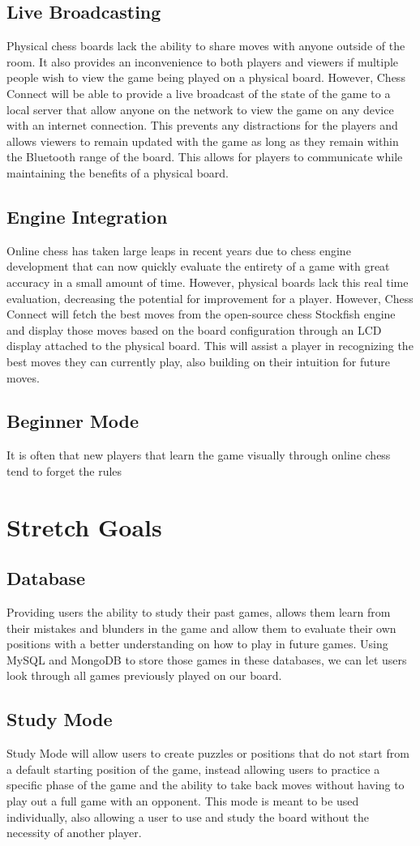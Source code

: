 \documentclass{article}
\begin{document}
\subsection{Live Broadcasting}
{Physical chess boards lack the ability to share moves with anyone outside of the room. It also provides an inconvenience to both players and viewers if multiple people wish to view the game being played on a physical board. However, Chess Connect will be able to provide a live broadcast of the state of the game to a local server that allow anyone on the network to view the game on any device with an internet connection. This prevents any distractions for the players and allows viewers to remain updated with the game as long as they remain within the Bluetooth range of the board. This allows for players to communicate while maintaining the benefits of a physical board.} 
\subsection{Engine Integration}
{Online chess has taken large leaps in recent years due to chess engine development that can now quickly evaluate the entirety of a game with great accuracy in a small amount of time. However, physical boards lack this real time evaluation, decreasing the potential for improvement for a player. However, Chess Connect will fetch the best moves from the open-source chess Stockfish engine and display those moves based on the board configuration through an LCD display attached to the physical board. This will assist a player in recognizing the best moves they can currently play, also building on their intuition for future moves.}
\subsection{Beginner Mode}
{It is often that new players that learn the game visually through online chess tend to forget the rules}

\section{Stretch Goals}
\subsection{Database}
Providing users the ability to study their past games, allows them learn from their mistakes and blunders in the game and allow them to evaluate their own positions with a better understanding on how to play in future games. Using MySQL and MongoDB to store those games in these databases, we can let users look through all games previously played on our board.
\subsection{Study Mode}
Study Mode will allow users to create puzzles or positions that do not start from a default starting position of the game, instead allowing users to practice a specific phase of the game and the ability to take back moves without having to play out a full game with an opponent. This mode is meant to be used individually, also allowing a user to use and study the board without the necessity of another player.
\end{document}

